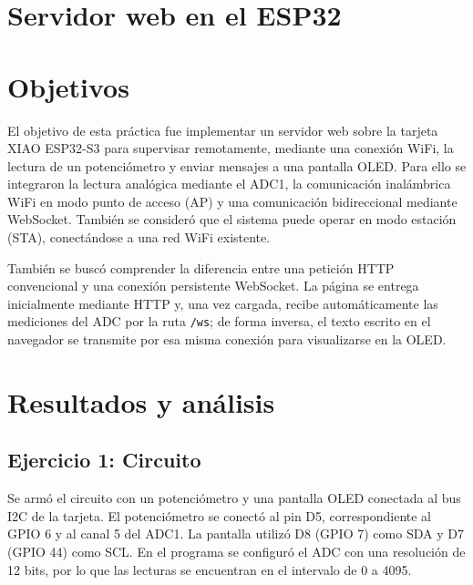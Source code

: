 \documentclass[12pt, letterpaper]{article}
\begin{document}



\normalsize

\section*{\centering \fontsize{14}{17}\sffamily\selectfont Servidor web en el ESP32}

\section*{\centering \fontsize{14}{17}\sffamily\selectfont Objetivos}

El objetivo de esta práctica fue implementar un servidor web sobre la tarjeta
XIAO ESP32-S3 para supervisar remotamente, mediante una conexión WiFi, la
lectura de un potenciómetro y enviar mensajes a una pantalla OLED. Para ello se
integraron la lectura analógica mediante el ADC1, la comunicación inalámbrica
WiFi en modo punto de acceso (AP) y una comunicación bidireccional mediante
WebSocket. También se consideró que el sistema puede operar en modo estación
(STA), conectándose a una red WiFi existente.

También se buscó comprender la diferencia entre una petición HTTP convencional
y una conexión persistente WebSocket. La página se entrega inicialmente
mediante HTTP y, una vez cargada, recibe automáticamente las mediciones del ADC
por la ruta \texttt{/ws}; de forma inversa, el texto escrito en el navegador se
transmite por esa misma conexión para visualizarse en la OLED.

\section*{\centering \fontsize{14}{17}\sffamily\selectfont Resultados y análisis}

\subsection*{\fontsize{12}{17}\sffamily\selectfont Ejercicio 1: Circuito}

Se armó el circuito con un potenciómetro y una pantalla OLED conectada al bus
I2C de la tarjeta. El potenciómetro se conectó al pin D5, correspondiente al
GPIO 6 y al canal 5 del ADC1. La pantalla utilizó D8 (GPIO 7) como SDA y D7
(GPIO 44) como SCL. En el programa se configuró el ADC con una resolución de 12
bits, por lo que las lecturas se encuentran en el intervalo de 0 a 4095.
\end{document}

